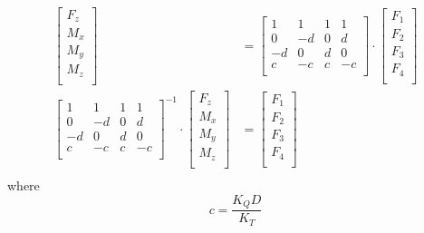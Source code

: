 \documentclass{article}
\numberwithin{equation}{section} %
\begin{document}
\begin{align}
\begin{bmatrix}
	F_z \\
	M_x \\
	M_y \\
	M_z \\
\end{bmatrix}
&=
\begin{bmatrix}
	1 & 1 & 1 & 1 \\
	0 &-d & 0 & d \\
   -d & 0 & d & 0 \\
	c &-c & c &-c \\
\end{bmatrix}
\cdot
\begin{bmatrix}
	F_1 \\
	F_2 \\
	F_3 \\
	F_4 \\
\end{bmatrix}
\\
\begin{bmatrix}
	1 & 1 & 1 & 1 \\
	0 &-d & 0 & d \\
   -d & 0 & d & 0 \\
	c &-c & c &-c \\
\end{bmatrix}^{-1}
\cdot
\begin{bmatrix}
	F_z \\
	M_x \\
	M_y \\
	M_z \\
\end{bmatrix}
&=
\begin{bmatrix}
	F_1 \\
	F_2 \\
	F_3 \\
	F_4 \\
\end{bmatrix}
\\
\end{align}
where
\begin{equation}
c = \frac{K_Q D}{K_T}
\end{equation}
\end{document}
